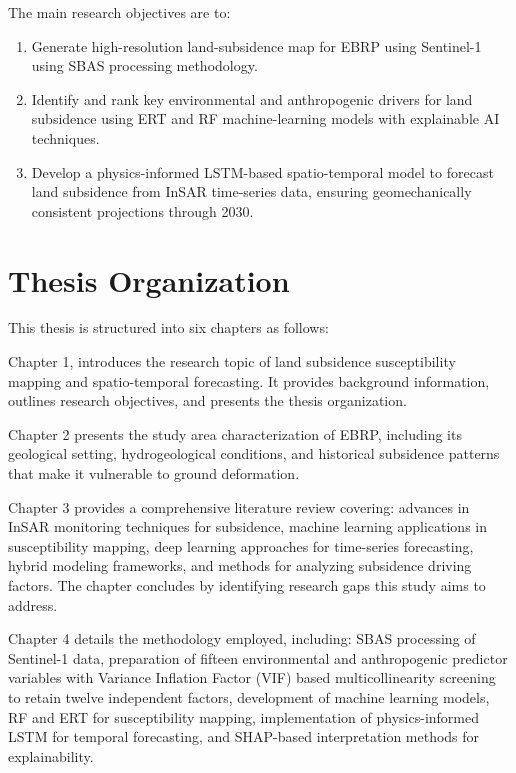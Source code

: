 \documentclass[oneside,doublespacing,flushright]{lsuthesis}
\begin{document}
The main research objectives are to:

\begin{enumerate}
\def\labelenumi{\roman{enumi}.}
\item
  Generate high-resolution land-subsidence map for EBRP using 
  Sentinel-1 using SBAS processing methodology.
\item
  Identify and rank key environmental and anthropogenic drivers for land subsidence
 using ERT and RF machine-learning models with explainable AI techniques.
\item
  Develop a physics-informed LSTM-based spatio-temporal model to forecast land subsidence from 
  InSAR time-series data, ensuring geomechanically consistent projections through 2030.
\end{enumerate}


\section{Thesis Organization}

This thesis is structured into six chapters as follows:

Chapter 1, introduces the research topic of land subsidence susceptibility mapping and spatio-temporal forecasting. It provides background information, outlines research objectives, and presents the thesis organization.

Chapter 2 presents the study area characterization of EBRP, including its geological setting, hydrogeological conditions, and historical subsidence patterns that make it vulnerable to ground deformation.

Chapter 3 provides a comprehensive literature review covering: advances in InSAR monitoring techniques for subsidence, machine learning applications in susceptibility mapping, deep learning approaches for time-series forecasting, hybrid modeling frameworks, and methods for analyzing subsidence driving factors. The chapter concludes by identifying research gaps this study aims to address.

Chapter 4 details the methodology employed, including: SBAS processing of Sentinel-1 data, preparation of fifteen environmental and anthropogenic predictor variables with Variance Inflation Factor (VIF) based multicollinearity screening to retain twelve independent factors, 
development of machine learning models, RF and ERT for susceptibility mapping, implementation of physics-informed LSTM for temporal forecasting, and SHAP-based interpretation methods for explainability.
\end{document}
